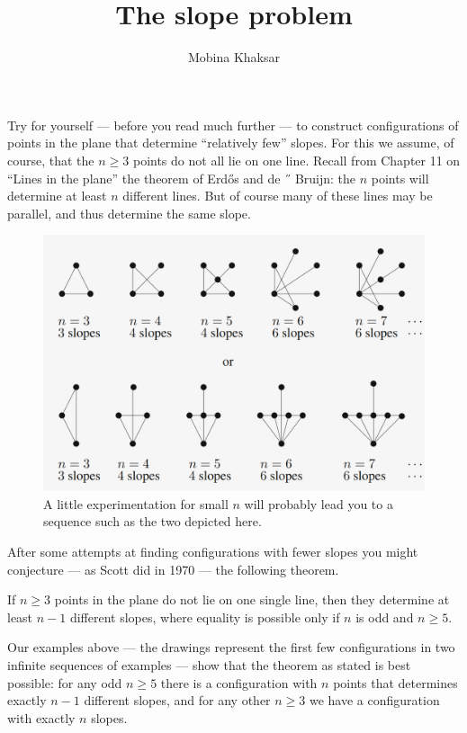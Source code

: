 \documentclass[a4paper]{article}
\title{The slope problem}
\author{Mobina Khaksar}
\affil{K. N. Toosi University of Technology, Faculty of Mathematics, Department of Computer Science}
\date{}
\begin{document}
\maketitle

\newpage
\noindent
Try for yourself — before you read much further — to construct configurations of points in the plane that determine “relatively few” slopes. For this we assume, of course, that the $n \geq 3$ points do not all lie on one line. Recall from Chapter 11 on “Lines in the plane” the theorem of Erd\H{o}s and de ˝ Bruijn: the $n$ points will determine at least $n$ different lines. But of course many of these lines may be parallel, and thus determine the same slope.

\begin{figure}[H]
    \centering
    \includegraphics[scale=0.4]{pics/picture1.png}
    \caption{A little experimentation for small $n$ will probably lead you to a sequence such as the two depicted here.}
\end{figure}
    
\noindent
After some attempts at finding configurations with fewer slopes you might conjecture — as Scott did in 1970 — the following theorem.
\begin{cthm}\label{thm1}
If $n \geq 3$ points in the plane do not lie on one single line, then they determine at least $n - 1$ different slopes, where equality is possible only if $n$ is odd and $n \geq 5$.
\end{cthm}

\noindent
Our examples above — the drawings represent the first few configurations in two infinite sequences of examples — show that the theorem as stated is best possible: for any odd $n \geq 5$ there is a configuration with $n$ points that determines exactly $n - 1$ different slopes, and for any other $n \geq 3$ we have a configuration with exactly $n$ slopes.
\end{document}
